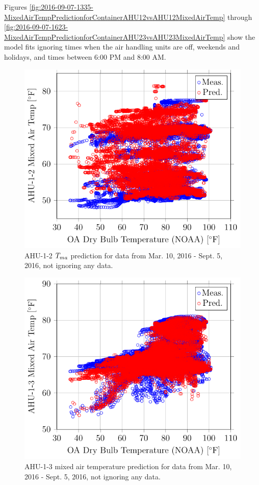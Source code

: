 Figures
\ref{fig:2016-09-07-1335-MixedAirTempPredictionforContainerAHU12vsAHU12MixedAirTemp}
through
\ref{fig:2016-09-07-1623-MixedAirTempPredictionforContainerAHU23vsAHU23MixedAirTemp}
show the model fits ignoring times when the air handling units are off,
weekends and holidays, and times between 6:00 PM and 8:00 AM.

\newcommand{\matcaption}[1]{#1 \(\mat\) prediction for data from Mar. 10, 2016 - Sept. 5, 2016, not ignoring any data.}

\begin{figure}
\centering
\includegraphics[]{Plots/2016-09-07-1218-AHU12MixedAirTempvsOADryBulbTemperatureNOAA.pdf}
\caption{\matcaption{AHU-1-2}}
\label{fig:2016-09-07-1218-AHU12MixedAirTempvsOADryBulbTemperatureNOAA}
\end{figure}

\begin{figure}
\centering
\includegraphics[]{Plots/2016-09-07-0943-AHU13MixedAirTempvsOADryBulbTemperatureNOAA.pdf}
\caption{AHU-1-3 mixed air temperature prediction for data from Mar. 10, 2016 - Sept. 5, 2016, not ignoring any data.}
\label{fig:AHU13MixedAirTempvsOADryBulbTemperatureNOAA-2}
\end{figure}



